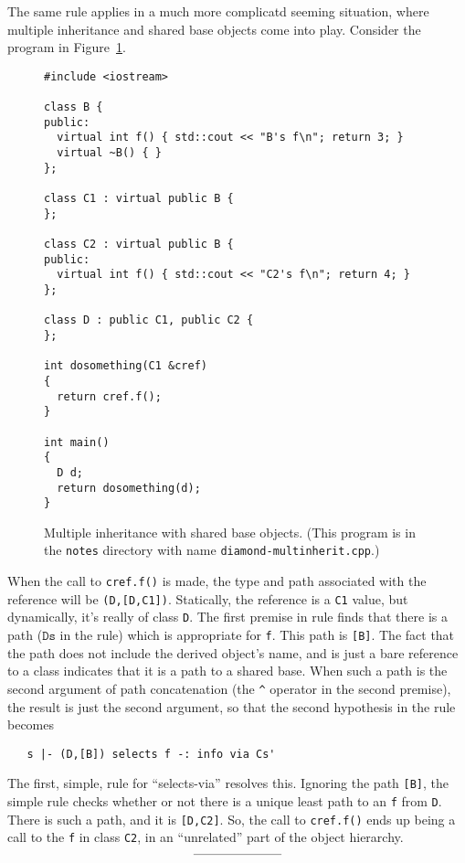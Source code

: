 \documentclass[11pt]{article}
\begin{document}
The same rule applies in a much more complicatd seeming situation,
where multiple inheritance and shared base objects come into play.
Consider the program in Figure~\ref{fig:diamond-cpp}.
\begin{figure}[hbtp]
\begin{verbatim}
#include <iostream>

class B {
public:
  virtual int f() { std::cout << "B's f\n"; return 3; }
  virtual ~B() { }
};

class C1 : virtual public B {
};

class C2 : virtual public B {
public:
  virtual int f() { std::cout << "C2's f\n"; return 4; }
};

class D : public C1, public C2 {
};

int dosomething(C1 &cref)
{
  return cref.f();
}

int main()
{
  D d;
  return dosomething(d);
}
\end{verbatim}
  \caption[Multiple Inheritance with Shared Base Objects]{Multiple
    inheritance with shared base objects.  (This program is in the
    \texttt{notes} directory with name
    \texttt{diamond-multinherit.cpp}.)}
\label{fig:diamond-cpp}
\end{figure}
When the call to \texttt{cref.f()} is made, the type and path
associated with the reference will be \texttt{(D,[D,C1])}.
Statically, the reference is a \texttt{C1} value, but dynamically,
it's really of class \texttt{D}. The first premise in rule
 finds that there is a path
($\texttt{Ds}$ in the rule) which is appropriate for \texttt{f}.  This
path is \texttt{[B]}.  The fact that the path does not include the
derived object's name, and is just a bare reference to a class
indicates that it is a path to a shared base.  When such a path is the
second argument of path concatenation
%
%
%
(the \texttt{\^{}} operator in the second premise), the result is just
the second argument, so that the second hypothesis in the rule becomes
\begin{verbatim}
   s |- (D,[B]) selects f -: info via Cs'
\end{verbatim}

The first, simple, rule for ``selects-via'' resolves this.  Ignoring
the path \texttt{[B]}, the simple rule checks whether or not there is
a unique least path to an \texttt{f} from \texttt{D}.  There is such a
path, and it is \texttt{[D,C2]}.  So, the call to \texttt{cref.f()}
ends up being a call to the \texttt{f} in class \texttt{C2}, in an
``unrelated'' part of the object hierarchy.
\[
\rule{0.2\textwidth}{.1mm}
\]
\end{document}
